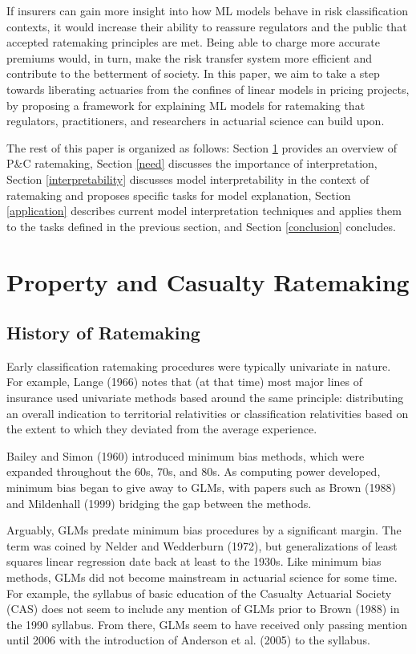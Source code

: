 \documentclass[preprint, 3p, twocolumn, letterpaper, 10pt]{elsarticle} %
\begin{document}
If insurers can gain more insight into how ML models behave in risk classification
contexts, it would increase their ability to reassure regulators and the public
that accepted ratemaking principles are met. Being able to charge more accurate
premiums would, in turn, make the risk transfer system more efficient and contribute
to the betterment of society. In this paper, we aim to take a step towards liberating
actuaries from the confines of linear models in pricing projects, by proposing a
framework for explaining ML models for ratemaking that regulators, practitioners,
and researchers in actuarial science can build upon.

The rest of this paper is organized as follows: Section \ref{ratemaking} provides
an overview of P\&C ratemaking, Section \ref{need} discusses the importance of
interpretation, Section \ref{interpretability} discusses model interpretability
in the context of ratemaking and proposes specific tasks for model explanation,
Section \ref{application} describes current model interpretation techniques and
applies them to the tasks defined in the previous section, and Section
\ref{conclusion} concludes.

\hypertarget{ratemaking}{%
\section{Property and Casualty Ratemaking}\label{ratemaking}}

\hypertarget{history-of-ratemaking}{%
\subsection{History of Ratemaking}\label{history-of-ratemaking}}

Early classification ratemaking procedures were typically univariate in nature.
For example, Lange (1966) notes that (at that time) most major lines of insurance
used univariate methods based around the same principle: distributing an overall
indication to territorial relativities or classification relativities based on
the extent to which they deviated from the average experience.

Bailey and Simon (1960) introduced minimum bias methods, which were expanded
throughout the 60s, 70s, and 80s. As computing power developed, minimum bias
began to give away to GLMs, with papers such as Brown (1988) and Mildenhall (1999)
bridging the gap between the methods.

Arguably, GLMs predate minimum bias procedures by a significant margin. The term
was coined by Nelder and Wedderburn (1972), but generalizations of least squares
linear regression date back at least to the 1930s. Like minimum bias methods,
GLMs did not become mainstream in actuarial science for some time. For example,
the syllabus of basic education of the Casualty Actuarial Society (CAS) does not
seem to include any mention of GLMs
prior to Brown (1988) in the 1990 syllabus. From there, GLMs
seem to have received only passing mention until 2006 with the introduction of
Anderson et al. (2005) to the syllabus.
\end{document}

